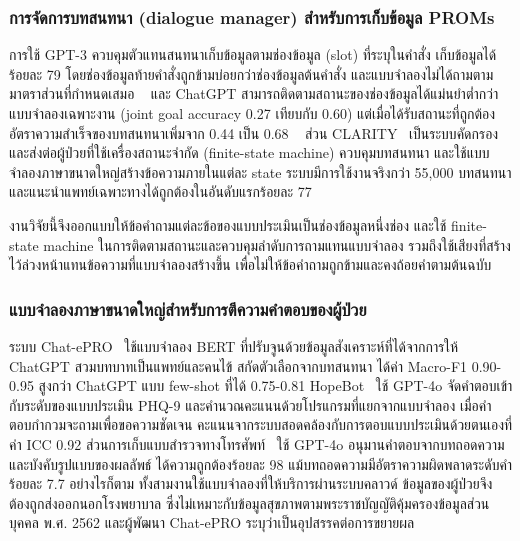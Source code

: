 \subsubsection{การจัดการบทสนทนา (dialogue manager) สำหรับการเก็บข้อมูล PROMs}
\label{sec:review-dialogue}

การใช้ GPT-3 ควบคุมตัวแทนสนทนาเก็บข้อมูลตามช่องข้อมูล (slot) ที่ระบุในคำสั่ง
เก็บข้อมูลได้ร้อยละ 79 โดยช่องข้อมูลท้ายคำสั่งถูกข้ามบ่อยกว่าช่องข้อมูลต้นคำสั่ง และแบบจำลองไม่ได้ถามตามมาตราส่วนที่กำหนดเสมอ ~\citep{Wei2024}
และ ChatGPT สามารถติดตามสถานะของช่องข้อมูลได้แม่นยำต่ำกว่าแบบจำลองเฉพาะงาน (joint goal accuracy 0.27 เทียบกับ 0.60) แต่เมื่อได้รับสถานะที่ถูกต้อง อัตราความสำเร็จของบทสนทนาเพิ่มจาก 0.44 เป็น 0.68 ~\citep{Hudecek2023}
ส่วน CLARITY~\citep{Shaposhnikov2025} เป็นระบบคัดกรองและส่งต่อผู้ป่วยที่ใช้เครื่องสถานะจำกัด (finite-state machine) ควบคุมบทสนทนา
และใช้แบบจำลองภาษาขนาดใหญ่สร้างข้อความภายในแต่ละ state ระบบมีการใช้งานจริงกว่า 55,000 บทสนทนา และแนะนำแพทย์เฉพาะทางได้ถูกต้องในอันดับแรกร้อยละ 77

งานวิจัยนี้จึงออกแบบให้ข้อคำถามแต่ละข้อของแบบประเมินเป็นช่องข้อมูลหนึ่งช่อง และใช้ finite-state machine ในการติดตามสถานะและควบคุมลำดับการถามแทนแบบจำลอง
รวมถึงใช้เสียงที่สร้างไว้ล่วงหน้าแทนข้อความที่แบบจำลองสร้างขึ้น เพื่อไม่ให้ข้อคำถามถูกข้ามและคงถ้อยคำตามต้นฉบับ \citep{Coons2009}

\subsubsection{แบบจำลองภาษาขนาดใหญ่สำหรับการตีความคำตอบของผู้ป่วย}
\label{sec:review-interpret}

ระบบ Chat-ePRO~\citep{Chen2024} ใช้แบบจำลอง BERT ที่ปรับจูนด้วยข้อมูลสังเคราะห์ที่ได้จากการให้ ChatGPT สวมบทบาทเป็นแพทย์และคนไข้ 
สกัดตัวเลือกจากบทสนทนา ได้ค่า Macro-F1 0.90-0.95 สูงกว่า ChatGPT แบบ few-shot ที่ได้ 0.75-0.81
HopeBot~\citep{Guo2025} ใช้ GPT-4o จัดคำตอบเข้ากับระดับของแบบประเมิน PHQ-9 และคำนวณคะแนนด้วยโปรแกรมที่แยกจากแบบจำลอง
เมื่อคำตอบกำกวมจะถามเพื่อขอความชัดเจน คะแนนจากระบบสอดคล้องกับการตอบแบบประเมินด้วยตนเองที่ค่า ICC 0.92
ส่วนการเก็บแบบสำรวจทางโทรศัพท์~\citep{Kaiyrbekov2025} ใช้ GPT-4o อนุมานคำตอบจากบทถอดความและบังคับรูปแบบของผลลัพธ์
ได้ความถูกต้องร้อยละ 98 แม้บทถอดความมีอัตราความผิดพลาดระดับคำร้อยละ 7.7
อย่างไรก็ตาม ทั้งสามงานใช้แบบจำลองที่ให้บริการผ่านระบบคลาวด์ ข้อมูลของผู้ป่วยจึงต้องถูกส่งออกนอกโรงพยาบาล
ซึ่งไม่เหมาะกับข้อมูลสุขภาพตามพระราชบัญญัติคุ้มครองข้อมูลส่วนบุคคล พ.ศ. 2562 และผู้พัฒนา Chat-ePRO ระบุว่าเป็นอุปสรรคต่อการขยายผล~\citep{Chen2024}

